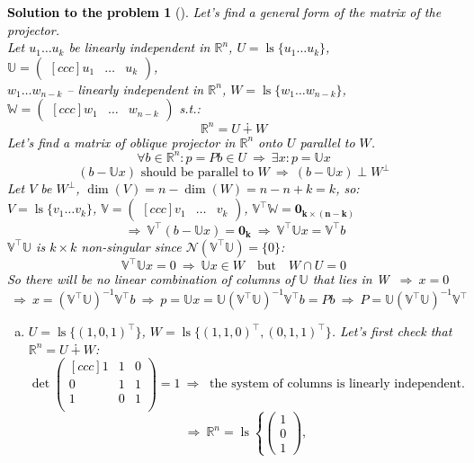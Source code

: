\documentclass[12pt,a4]{article}
\newtheorem{solution}{Solution to the problem}
\newcommand\ls{\operatorname{ls}}
\newcommand{\bR}{{\mathbb R}}
\newcommand{\bU}{{\mathbb U}}
\newcommand{\bW}{{\mathbb W}}
\newcommand{\bV}{{\mathbb V}}
\newcommand{\Ker}{{\mathcal N}}
\begin{document}
\textcolor{black}{
\begin{solution}[]\rm Let's find a general form of the matrix of the projector.\\
Let
$u_1 \dots u_k$ be linearly independent in $\bR^n$,
$U =\ls\{u_1 \dots u_k\}$,
$\bU = \begin{pmatrix}[ccc] u_1 & \dots & u_k \end{pmatrix}$, \\
$w_1 \dots w_{n-k}$ -- linearly independent in $\bR^n$,
$W =\ls\{w_1 \dots w_{n-k}\}$,
$\bW = \begin{pmatrix}[ccc] w_1 & \dots & w_{n-k} \end{pmatrix}$ s.t.:
\[
\bR^n = U \dotplus W
\]
Let's find a matrix of oblique projector in $\bR^n$ onto $U$ parallel to $W$.
\[
\forall b \in \bR^n: p = Pb \in U
~ \Rightarrow ~
\exists x: p = \bU x
\]
\[
(b - \bU x) \text{ should be parallel to } W
~ \Rightarrow ~
(b - \bU x) \perp W^\perp
\]
Let $V$ be $W^\perp$,
$\dim(V) = n - \dim(W) = n - n + k = k$, so:\\[5pt]
$V =\ls\{v_1 \dots v_k\}$,
$\bV = \begin{pmatrix}[ccc] v_1 & \dots & v_k \end{pmatrix}$,
$\bV^\top\bW = \mathbf{0_{k\times(n-k)}} $
\[
~ \Rightarrow ~
\bV^\top(b - \bU x) = \mathbf{0_k}
~ \Rightarrow ~
\bV^\top\bU x = \bV^\top b
\]
$\bV^\top\bU$ is $k\times k$ non-singular since $\Ker(\bV^\top\bU) = \{0\}$:
\[
\bV^\top\bU x = 0 
~ \Rightarrow ~
\bU x \in W
\quad
\text{but}
\quad
W \cap U = 0 
\]
So there will be no linear combination of columns of $\bU$ that lies in W
$~ \Rightarrow ~ x = 0$\\
\[
~ \Rightarrow ~
x = (\bV^\top\bU)^{-1}\bV^\top b
~ \Rightarrow ~
p = \bU x = \bU (\bV^\top\bU)^{-1}\bV^\top b = Pb
~ \Rightarrow ~
P = \bU (\bV^\top\bU)^{-1}\bV^\top
\]
	\begin{enumerate}[(a)]
	\item 
$U =\ls \{(1,0,1)^\top\}$, $W = \ls\{(1,1,0)^\top, (0,1,1)^\top\}$.
Let's first check that $\bR^n = U \dotplus W$:
\[
\det 
\begin{pmatrix}[ccc]
1 & 1 & 0 \\
0 & 1 & 1 \\
1 & 0 & 1 \\
\end{pmatrix}
= 1 ~ \Rightarrow ~ 
 \text{ the system of columns is linearly independent.}
 \]
 \[
 ~ \Rightarrow ~ 
\bR^n = 
\ls \left \{
\begin{pmatrix}1\\0\\1\end{pmatrix}, 
\]
\end{enumerate}
\end{solution}}
\end{document}
